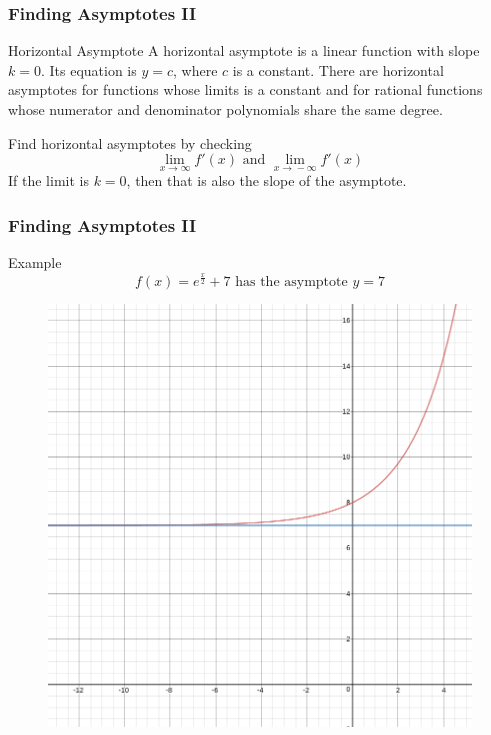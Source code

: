 \documentclass[xcolor=dvipsnames]{beamer}
\begin{document}
\begin{frame}
  \frametitle{Finding Asymptotes II}
\begin{block}{Horizontal Asymptote}
  A horizontal asymptote is a linear function with slope $k=0$. Its
  equation is $y=c$, where $c$ is a constant. There are horizontal
  asymptotes for functions whose limits is a constant and for rational
  functions whose numerator and denominator polynomials share the same
  degree.
\end{block}
Find horizontal asymptotes by checking
\begin{equation}
  \label{eq:udaiguph}
  \lim_{x\rightarrow\infty}f'(x)\mbox{ and }\lim_{x\rightarrow{}-\infty}f'(x)
\end{equation}
If the limit is $k=0$, then that is also the slope of the asymptote.
\end{frame}

\begin{frame}
  \frametitle{Finding Asymptotes II}
Example
\begin{equation}
  \label{eq:tohwoiph}
f(x)=e^{\frac{x}{2}}+7\mbox{ has the asymptote }y=7
\end{equation}
\begin{figure}[h]
\includegraphics[scale=.25]{./diagrams/asymp3.png}
\end{figure}
\end{frame}
\end{document}
